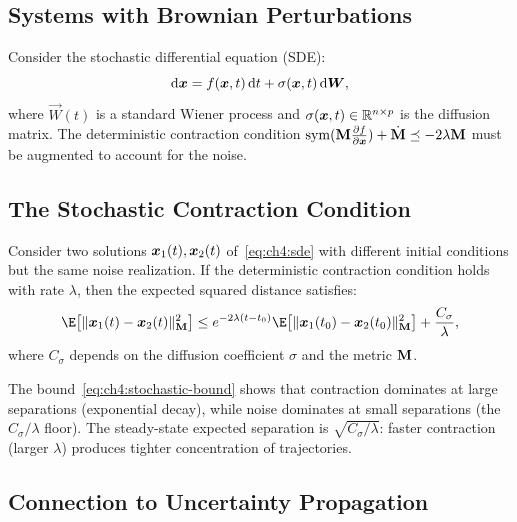 \subsection{Systems with Brownian Perturbations}

Consider the stochastic differential equation (SDE):
\begin{equation}
\mathrm{d}\bm{x} = f(\bm{x}, t)\,\mathrm{d} t + \sigma(\bm{x}, t)\,\mathrm{d}\bm{W},
\label{eq:ch4:sde}
\end{equation}
where $\vec{W}(t)$ is a standard Wiener process and $\sigma(\bm{x}, t) \in \mathbb{R}^{n \times p}$ is
the diffusion matrix. The deterministic contraction condition
$\operatorname{sym}(\mathbf{M}\tfrac{\partial f}{\partial \bm{x}}) + \dot{\mathbf{M}} \preceq -2\lambda\mathbf{M}$
must be augmented to account for the noise.

\subsection{The Stochastic Contraction Condition}

\begin{theorem}
\label{thm:ch4:stochastic-contraction}
Consider two solutions $\bm{x}_1(t), \bm{x}_2(t)$ of~\eqref{eq:ch4:sde} with different initial
conditions but the same noise realization. If the deterministic contraction condition
holds with rate $\lambda$, then the expected squared distance satisfies:
\begin{equation}
\E\!\left[\|\x_1(t) - \x_2(t)\|_{\mat{M}}^2\right]
\leq e^{-2\lambda(t-t_0)} \E\!\left[\|\x_1(t_0) - \x_2(t_0)\|_{\mat{M}}^2\right]
+ \frac{C_\sigma}{\lambda},
\label{eq:ch4:stochastic-bound}
\end{equation}
where $C_\sigma$ depends on the diffusion coefficient $\sigma$ and the metric $\mathbf{M}$.
\end{theorem}

The bound~\eqref{eq:ch4:stochastic-bound} shows that contraction dominates at large
separations (exponential decay), while noise dominates at small separations (the
$C_\sigma / \lambda$ floor). The steady-state expected separation is
$\sqrt{C_\sigma / \lambda}$: faster contraction (larger $\lambda$) produces tighter
concentration of trajectories.

\subsection{Connection to Uncertainty Propagation}

